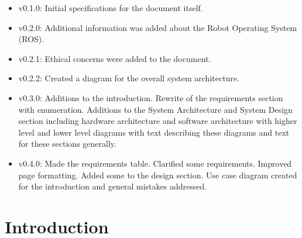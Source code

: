 \documentclass[english,12pt]{article}
\begin{document}
\begin{itemize}
	\item v0.1.0: Initial specifications for the document itself.
    \item v0.2.0: Additional information was added about the Robot 
    Operating System (ROS).
    \item v0.2.1: Ethical concerns were added to the document.
    \item v0.2.2: Created a diagram for the overall system architecture.
    \item v0.3.0: Additions to the introduction. Rewrite of the requirements section with
    enumeration. Additions to the System Architecture and System Design
    section including hardware architecture and software architecture with
    higher level and lower level diagrams with text describing these diagrams
    and text for these sections generally.
    \item v0.4.0: Made the requirements table. Clarified some requirements. Improved page
    formatting. Added some to the design section. Use case diagram created for
    the introduction and general mistakes addressed.
\end{itemize}


\section{Introduction}
\end{document}
